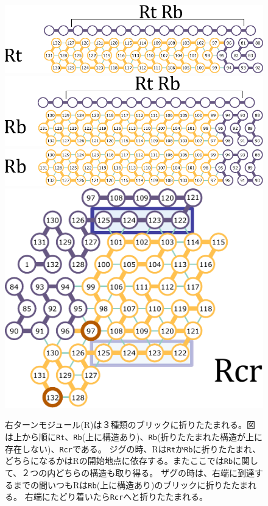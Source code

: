 \documentclass[a4j,11pt]{article}
\begin{document}
%
%
\begin{figure}[tb]
  \centering
   \includegraphics[width=0.8\linewidth]{fig/svg/Rt_1.pdf}\\
   \vspace*{5mm}
   \includegraphics[width=0.8\linewidth]{fig/svg/Rb_2.pdf}\\
   \vspace*{3mm}
   \includegraphics[width=0.8\linewidth]{fig/svg/Rb_1.pdf}\\
   \vspace*{5mm}
   \includegraphics[width=0.5\linewidth]{fig/svg/Rtr_1.pdf}

 \caption{右ターンモジュール(R)は３種類のブリックに折りたたまれる。図は上から順に\texttt{Rt}、\texttt{Rb}(上に構造あり)、\texttt{Rb}(折りたたまれた構造が上に存在しない)、\texttt{Rcr}である。
 ジグの時、Rは\texttt{Rt}か\texttt{Rb}に折りたたまれ、どちらになるかはRの開始地点に依存する。またここでは\texttt{Rb}に関して、２つの内どちらの構造も取り得る。
ザグの時は、右端に到達するまでの間いつもRは\texttt{Rb}(上に構造あり)のブリックに折りたたまれる。
右端にたどり着いたら\texttt{Rcr}へと折りたたまれる。}
 \label{fig:rightturns}
\end{figure}
\end{document}
